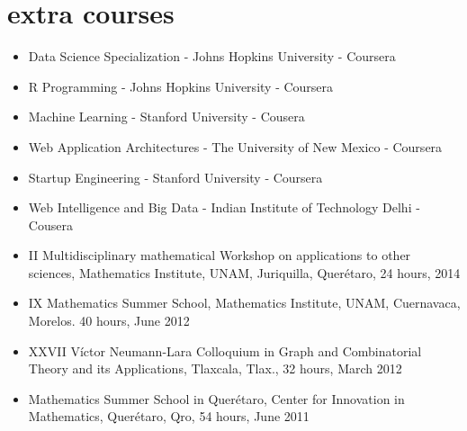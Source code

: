 \documentclass[]{friggeri-cv}
\begin{document}
%

\section{extra courses}
\begin{itemize}
\item Data Science Specialization - Johns Hopkins University - Coursera
\item R Programming - Johns Hopkins University - Coursera
\item Machine Learning - Stanford University - Cousera
\item Web Application Architectures - The University of New Mexico - Coursera
\item Startup Engineering - Stanford University - Coursera
\item Web Intelligence and Big Data - Indian Institute of Technology Delhi - Cousera
\item II Multidisciplinary mathematical Workshop on applications to other sciences,  Mathematics Institute, UNAM, Juriquilla, Quer\'{e}taro, 24 hours, 2014
\item IX Mathematics Summer School, Mathematics Institute, UNAM, Cuernavaca, Morelos. 40 hours, June 2012
\item XXVII  V\'{i}ctor Neumann-Lara  Colloquium in Graph and Combinatorial Theory and its Applications, Tlaxcala, Tlax., 32 hours, March 2012
\item Mathematics Summer School in Quer\'{e}taro, Center for Innovation in Mathematics, Quer\'{e}taro, Qro, 54 hours, June 2011
\end{itemize}

\end{document}
